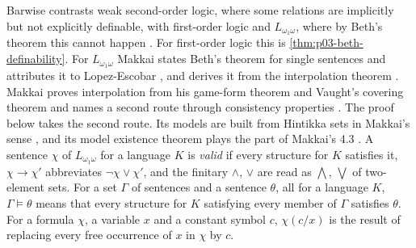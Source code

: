 Barwise contrasts weak second-order logic, where some relations are
implicitly but not explicitly definable, with first-order logic and
\(L_{\omega_1\omega}\), where by Beth's theorem this cannot happen
\cite[ch.~A.1, \S5, p.~44]{Barwise1977FirstOrder}.  For first-order logic
this is \cref{thm:p03-beth-definability}.  For \(L_{\omega_1\omega}\)
Makkai states Beth's theorem for single sentences and attributes it to
Lopez-Escobar \cite[ch.~A.7, \S1, p.~236]{Makkai1977}, and derives it from
the interpolation theorem \cite[ch.~A.7, \S8, 8.6, p.~274]{Makkai1977}.
Makkai proves interpolation from his game-form theorem and Vaught's
covering theorem \cite[ch.~A.7, \S8, 8.1--8.2, pp.~271--272]{Makkai1977}
and names a second route through consistency properties
\cite[ch.~A.7, \S8, p.~274]{Makkai1977}.  The proof below takes the second
route.  Its models are built from Hintikka sets in Makkai's sense
\cite[ch.~A.7, \S4, 4.1--4.2, p.~250]{Makkai1977}, and its model existence
theorem plays the part of Makkai's 4.3
\cite[ch.~A.7, \S4, p.~251]{Makkai1977}.  A sentence \(\chi\) of
\(L_{\omega_1\omega}\) for a language \(K\) is \emph{valid} if every
structure for \(K\) satisfies it, \(\chi\to\chi'\) abbreviates
\(\neg\chi\lor\chi'\), and the finitary \(\land\), \(\lor\) are read as
\(\bigwedge\), \(\bigvee\) of two-element sets.  For a set \(\Gamma\) of
sentences and a sentence \(\theta\), all for a language \(K\),
\(\Gamma\models\theta\) means that every structure for \(K\) satisfying
every member of \(\Gamma\) satisfies \(\theta\).  For a formula \(\chi\), a
variable \(x\) and a constant symbol \(c\), \(\chi(c/x)\) is the result of
replacing every free occurrence of \(x\) in \(\chi\) by \(c\).

